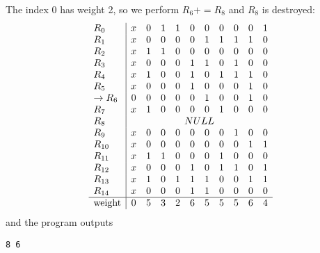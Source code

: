 \documentclass{article}
\begin{document}
The index 0 has weight 2, so we perform $R_6 += R_8$ and $R_8$ is
destroyed:
$$
\begin{array}{l|cccccccccc}
R_{0}& x& 0& 1& 1& 0& 0& 0& 0& 0& 1\\
R_{1}& x& 0& 0& 0& 0& 1& 1& 1& 1& 0\\
R_{2}& x& 1& 1& 0& 0& 0& 0& 0& 0& 0\\
R_{3}& x& 0& 0& 0& 1& 1& 0& 1& 0& 0\\
R_{4}& x& 1& 0& 0& 1& 0& 1& 1& 1& 0\\
R_{5}& x& 0& 0& 0& 1& 0& 0& 0& 1& 0\\
\rightarrow R_{6}& 0& 0& 0& 0& 0& 1& 0& 0& 1& 0\\
R_{7}& x& 1& 0& 0& 0& 0& 1& 0& 0& 0\\
R_{8}& \multicolumn{10}{c}{NULL} \\
R_{9}& x& 0& 0& 0& 0& 0& 0& 1& 0& 0\\
R_{10}& x& 0& 0& 0& 0& 0& 0& 0& 1& 1\\
R_{11}& x& 1& 1& 0& 0& 0& 1& 0& 0& 0\\
R_{12}& x& 0& 0& 0& 1& 0& 1& 1& 0& 1\\
R_{13}& x& 1& 0& 1& 1& 1& 0& 0& 1& 1\\
R_{14}& x& 0& 0& 0& 1& 1& 0& 0& 0& 0\\
\hline
\text{weight}& 0& 5& 3& 2& 6& 5& 5& 5& 6& 4\\
\end{array}
$$
and the program outputs
\begin{verbatim}
8 6
\end{verbatim}
\end{document}

